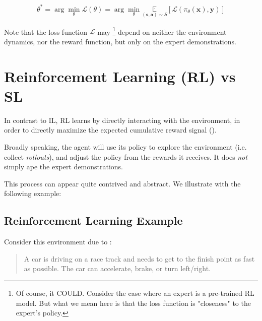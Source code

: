 \documentclass{article} %
\begin{document}
\begin{equation} \label {il_obj}
    \theta^* = \arg\min_\theta \mathcal{L}(\theta) = \arg\min_\theta \underset{(\mathbf{s}, \mathbf{a}) \sim S}{\mathbb{E}}[\mathcal{L}(\pi_\theta(\mathbf{x}), \mathbf{y})]
\end{equation}

Note that the loss function $\mathcal{L}$ may 
\footnote{{\color{red} 
    Of course, it COULD. Consider the case where an expert is a pre-trained RL model. 
    But what we mean here is that the loss function is "closeness" to the expert's policy.
}}
depend on neither the environment dynamics,
nor the reward function, but only on the expert demonstrations.

\section{Reinforcement Learning (RL) vs SL}

In contrast to IL, RL learns by directly interacting with the environment,
in order to directly maximize the expected cumulative reward signal (\cite{Sutton-and-Barto-1998}).

Broadly speaking, the agent will use its policy to explore the environment (i.e. collect \textit{rollouts}),
and adjust the policy from the rewards it receives. It does \textit{not} simply ape the expert demonstrations.

This process can appear quite contrived and abstract. We illustrate with the following example:

\subsection{Reinforcement Learning Example}
Consider this environment due to \cite{Towers-et-al-2024}:
\begin{quote}
    A car is driving on a race track and needs to get to the finish point
    as fast as possible. The car can accelerate, brake, or turn left/right.
\end{quote}
\end{document}
